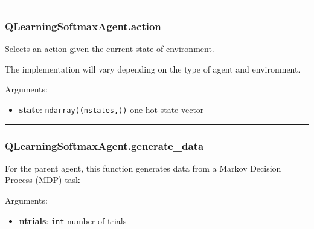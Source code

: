 \begin{center}\rule{0.5\linewidth}{\linethickness}\end{center}

\subsubsection{QLearningSoftmaxAgent.action}\label{qlearningsoftmaxagent.action}

\begin{Shaded}
\begin{Highlighting}[]
\end{Highlighting}
\end{Shaded}

Selects an action given the current state of environment.

The implementation will vary depending on the type of agent and
environment.

Arguments:

\begin{itemize}
\tightlist
\item
  \textbf{state}: \texttt{ndarray((nstates,))} one-hot state vector
\end{itemize}

\begin{center}\rule{0.5\linewidth}{\linethickness}\end{center}

\subsubsection{QLearningSoftmaxAgent.generate\_data}\label{qlearningsoftmaxagent.generate_data}

\begin{Shaded}
\begin{Highlighting}[]
\end{Highlighting}
\end{Shaded}

For the parent agent, this function generates data from a Markov
Decision Process (MDP) task

Arguments:

\begin{itemize}
\tightlist
\item
  \textbf{ntrials}: \texttt{int} number of trials
\end{itemize}

